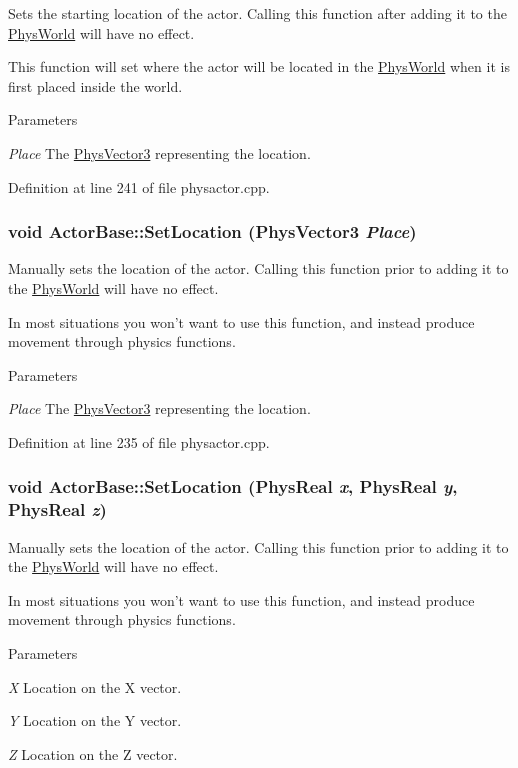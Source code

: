 Sets the starting location of the actor. Calling this function after adding it to the \hyperlink{classPhysWorld}{PhysWorld} will have no effect. \par
 This function will set where the actor will be located in the \hyperlink{classPhysWorld}{PhysWorld} when it is first placed inside the world. 
\begin{DoxyParams}{Parameters}
\item[{\em Place}]The \hyperlink{classPhysVector3}{PhysVector3} representing the location. \end{DoxyParams}


Definition at line 241 of file physactor.cpp.\hypertarget{classActorBase_a2a204add0b036de441ebd59d14939000}{
\subsubsection[{SetLocation}]{\setlength{\rightskip}{0pt plus 5cm}void ActorBase::SetLocation ({\bf PhysVector3} {\em Place})}}
\label{dd/d7b/classActorBase_a2a204add0b036de441ebd59d14939000}


Manually sets the location of the actor. Calling this function prior to adding it to the \hyperlink{classPhysWorld}{PhysWorld} will have no effect. \par
 In most situations you won't want to use this function, and instead produce movement through physics functions. 
\begin{DoxyParams}{Parameters}
\item[{\em Place}]The \hyperlink{classPhysVector3}{PhysVector3} representing the location. \end{DoxyParams}


Definition at line 235 of file physactor.cpp.\hypertarget{classActorBase_a34848d620c5d9d2796999edbdcb77c9a}{
\subsubsection[{SetLocation}]{\setlength{\rightskip}{0pt plus 5cm}void ActorBase::SetLocation (PhysReal {\em x}, \/  PhysReal {\em y}, \/  PhysReal {\em z})}}
\label{dd/d7b/classActorBase_a34848d620c5d9d2796999edbdcb77c9a}


Manually sets the location of the actor. Calling this function prior to adding it to the \hyperlink{classPhysWorld}{PhysWorld} will have no effect. \par
 In most situations you won't want to use this function, and instead produce movement through physics functions. 
\begin{DoxyParams}{Parameters}
\item[{\em X}]Location on the X vector. \item[{\em Y}]Location on the Y vector. \item[{\em Z}]Location on the Z vector. \end{DoxyParams}


